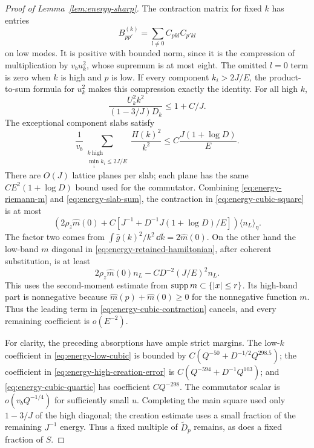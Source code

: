 \begin{proof}[Proof of Lemma~\ref{lem:energy-sharp}]
The contraction matrix for fixed $k$ has entries
\[
 B^{(k)}_{pp'}=\sum_{l\ne0}C_{pkl}C_{p'kl}
\]
on low modes.  It is positive with bounded norm, since it is the
compression of multiplication by $v_bu_k^2$, whose supremum is at
most eight.  The omitted $l=0$ term is zero when $k$ is high and $p$
is low.  If every component $k_i>2J/E$, the product-to-sum formula for
$u_k^2$ makes this compression exactly the identity.
For all high $k$,
\[
 \frac{U_k^2k^2}{(1-3/J)D_k}\le1+C/J.
\]
The exceptional component slabs satisfy
\begin{equation}\label{eq:energy-slab-sum}
 \frac1{v_b}\sum_{\substack{k\ \text{high}\\\min_i k_i\le2J/E}}
                \frac{H(k)^2}{k^2}
       \le C\frac{J(1+\log D)}E.
\end{equation}
There are $O(J)$ lattice planes per slab; each plane has the same
$CE^2(1+\log D)$ bound used for the commutator.  Combining
\eqref{eq:energy-riemann-m} and \eqref{eq:energy-slab-sum}, the
contraction in \eqref{eq:energy-cubic-square} is at most
\begin{equation}\label{eq:energy-cubic-contraction}
 \left(2\rho_z\widehat m(0)
       +C\left[J^{-1}+D^{-1}J(1+\log D)/E\right]\right)
                                      \langle n_L\rangle_\eta.
\end{equation}
The factor two comes from
$\int\widehat g(k)^2/k^2\,\dd\bar k=2\widehat m(0)$.
On the other hand the low-band $m$ diagonal in
\eqref{eq:energy-retained-hamiltonian}, after coherent substitution,
is at least
\[
 2\rho_z\widehat m(0)n_L-CD^{-2}(J/E)^2n_L.
\]
This uses the second-moment estimate from $\operatorname{supp} m\subset\{|x|\le r\}$.
Its high-band part is nonnegative because
$\widehat m(p)+\widehat m(0)\ge0$ for the nonnegative function $m$.
Thus the leading term in \eqref{eq:energy-cubic-contraction} cancels,
and every remaining coefficient is $o(E^{-2})$.

For clarity, the preceding absorptions have ample strict margins.
The low-$k$ coefficient in \eqref{eq:energy-low-cubic} is bounded by
$C(Q^{-50}+D^{-1/2}Q^{298.5})$; the coefficient in
\eqref{eq:energy-high-creation-error} is
$C(Q^{-594}+D^{-1}Q^{103})$; and
\eqref{eq:energy-cubic-quartic} has coefficient $CQ^{-298}$.
The commutator scalar is $o(v_bQ^{-1/4})$ for sufficiently small $u$.
Completing the main square used only $1-3/J$ of the high diagonal;
the creation estimate uses a small fraction of the remaining
$J^{-1}$ energy.  Thus a fixed multiple of $\widetilde D_p$ remains,
as does a fixed fraction of $S$.


\end{proof}
